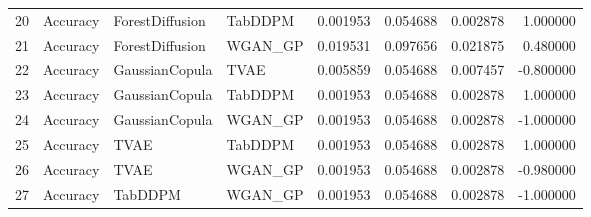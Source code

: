 \begin{tabular}{llllrrrr}
20 & Accuracy & ForestDiffusion & TabDDPM & 0.001953 & 0.054688 & 0.002878 & 1.000000 \\
21 & Accuracy & ForestDiffusion & WGAN_GP & 0.019531 & 0.097656 & 0.021875 & 0.480000 \\
22 & Accuracy & GaussianCopula & TVAE & 0.005859 & 0.054688 & 0.007457 & -0.800000 \\
23 & Accuracy & GaussianCopula & TabDDPM & 0.001953 & 0.054688 & 0.002878 & 1.000000 \\
24 & Accuracy & GaussianCopula & WGAN_GP & 0.001953 & 0.054688 & 0.002878 & -1.000000 \\
25 & Accuracy & TVAE & TabDDPM & 0.001953 & 0.054688 & 0.002878 & 1.000000 \\
26 & Accuracy & TVAE & WGAN_GP & 0.001953 & 0.054688 & 0.002878 & -0.980000 \\
27 & Accuracy & TabDDPM & WGAN_GP & 0.001953 & 0.054688 & 0.002878 & -1.000000 \\
\bottomrule
\end{tabular}
